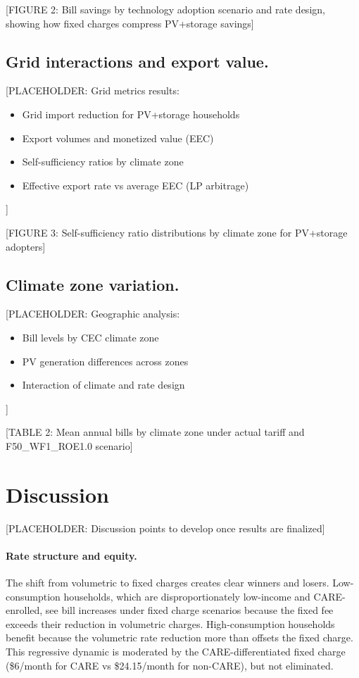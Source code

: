 \documentclass[9pt,twocolumn,twoside]{pnas-new}
\begin{document}
[FIGURE 2: Bill savings by technology adoption scenario and rate design, showing how fixed charges compress PV+storage savings]

\subsection*{Grid interactions and export value.}
[PLACEHOLDER: Grid metrics results:
\begin{itemize}
    \item Grid import reduction for PV+storage households
    \item Export volumes and monetized value (EEC)
    \item Self-sufficiency ratios by climate zone
    \item Effective export rate vs average EEC (LP arbitrage)
\end{itemize}
]

[FIGURE 3: Self-sufficiency ratio distributions by climate zone for PV+storage adopters]

\subsection*{Climate zone variation.}
[PLACEHOLDER: Geographic analysis:
\begin{itemize}
    \item Bill levels by CEC climate zone
    \item PV generation differences across zones
    \item Interaction of climate and rate design
\end{itemize}
]

[TABLE 2: Mean annual bills by climate zone under actual tariff and F50\_WF1\_ROE1.0 scenario]

\section*{Discussion}

[PLACEHOLDER: Discussion points to develop once results are finalized]

\paragraph{Rate structure and equity.}
The shift from volumetric to fixed charges creates clear winners and losers. Low-consumption households, which are disproportionately low-income and CARE-enrolled, see bill increases under fixed charge scenarios because the fixed fee exceeds their reduction in volumetric charges. High-consumption households benefit because the volumetric rate reduction more than offsets the fixed charge. This regressive dynamic is moderated by the CARE-differentiated fixed charge (\$6/month for CARE vs \$24.15/month for non-CARE), but not eliminated.
\end{document}

